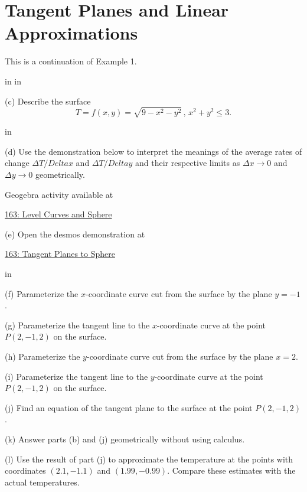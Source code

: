 \documentclass{ximera}
\newcommand{\pskip}{\vskip 0.1 in}
\begin{document}
\section{Tangent Planes and Linear Approximations}


\begin{example}  \label{Esdtr435r}
This is a continuation of Example 1. 

\pskip \pskip

(c) Describe the surface
\[
  T = f(x,y) = \sqrt{9-x^2-y^2} \, , \, x^2 + y^2 \leq 3 .
\]

\pskip

(d) Use the demonstration below to interpret the meanings of the average rates of change $\Delta T/Delta x$ and $\Delta T/Delta y$ and their respective limits as $\Delta x\to 0$ and $\Delta y\to 0$ geometrically.

 
\begin{onlineOnly}
    \begin{center}
\end{center}
\end{onlineOnly}

Geogebra activity available at

\href{https://www.geogebra.org/classic/egnkjkqw}{163: Level Curves and Sphere}




(e) Open the desmos demonstration at

\href{https://www.desmos.com/3d/967c10cbdc}{163: Tangent Planes to Sphere}

\pskip

(f) Parameterize the $x$-coordinate curve cut from the surface by the plane $y=-1$.

(g) Parameterize the tangent line to the $x$-coordinate curve at the point $P(2,-1,2)$ on the surface.

(h) Parameterize the $y$-coordinate curve cut from the surface by the plane $x=2$.

(i) Parameterize the tangent line to the $y$-coordinate curve at the point $P(2,-1,2)$ on the surface.

(j) Find an equation of the tangent plane to the surface at the point $P(2,-1,2)$.

(k) Answer parts (b) and (j) geometrically without using calculus.

(l) Use the result of part (j) to approximate the temperature at the points with coordinates $(2.1, -1.1)$ and $(1.99, -0.99)$. Compare these estimates with the actual temperatures.

\end{example}
\end{document}
